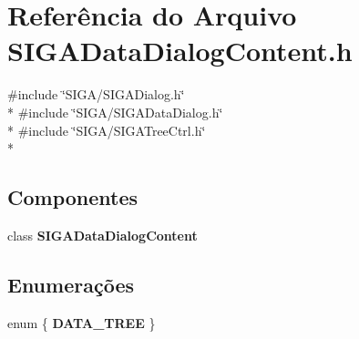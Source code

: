 \section{Referência do Arquivo S\+I\+G\+A\+Data\+Dialog\+Content.\+h}
\label{_s_i_g_a_data_dialog_content_8h}
{\ttfamily \#include \char`\"{}S\+I\+G\+A/\+S\+I\+G\+A\+Dialog.\+h\char`\"{}}\\*
{\ttfamily \#include \char`\"{}S\+I\+G\+A/\+S\+I\+G\+A\+Data\+Dialog.\+h\char`\"{}}\\*
{\ttfamily \#include \char`\"{}S\+I\+G\+A/\+S\+I\+G\+A\+Tree\+Ctrl.\+h\char`\"{}}\\*
\subsection*{Componentes}
\begin{DoxyCompactItemize}
\item 
class {\bf S\+I\+G\+A\+Data\+Dialog\+Content}
\end{DoxyCompactItemize}
\subsection*{Enumerações}
\begin{DoxyCompactItemize}
\item 
enum \{ {\bf D\+A\+T\+A\+\_\+\+T\+R\+EE}
 \}
\end{DoxyCompactItemize}
